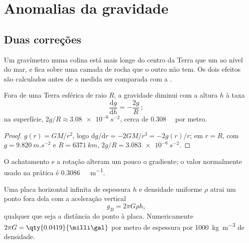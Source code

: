 \section{Anomalias da gravidade}

\subsection*{Duas correções}

Um gravímetro numa colina está mais longe do centro da Terra que um ao nível do mar,
e fica sobre uma camada de rocha que o outro não tem. Os dois efeitos são
calculados antes de a medida ser comparada com a .

\begin{proposition}\label{prop:b1:isostasy-gravity:free-air}
Fora de uma Terra esférica de raio $R$, a gravidade diminui com a altura $h$ à
taxa
\[
  \frac{\mathrm dg}{\mathrm dh} = -\frac{2g}{R}\,;
\]
na superfície, $2g/R \approx \qty{3.08e-6}{s^{-2}}$, cerca de
\qty{0.308}{\milli\gal} por metro.
\end{proposition}

\begin{proof}
$g(r) = GM/r^2$, logo $\mathrm dg/\mathrm dr = -2GM/r^3 = -2g(r)/r$; em $r = R$,
com $g = \qty{9.820}{m.s^{-2}}$ e $R = \qty{6371}{km}$, $2g/R =
\qty{3.083e-6}{s^{-2}}$.
\end{proof}

O achatamento e a rotação alteram um pouco o gradiente; o valor normalmente usado na
prática é \qty{0.3086}{\milli\gal.m^{-1}}.

\begin{proposition}\label{prop:b1:isostasy-gravity:slab}
Uma placa horizontal infinita de espessura $h$ e densidade uniforme $\rho$ atrai
um ponto fora dela com a aceleração vertical
\[
  g_B = 2\pi G\rho h ,
\]
qualquer que seja a distância do ponto à placa. Numericamente $2\pi G =
\qty{0.0419}{\milli\gal}$ por metro de espessura por \qty{1000}{kg.m^{-3}} de
densidade.
\end{proposition}

